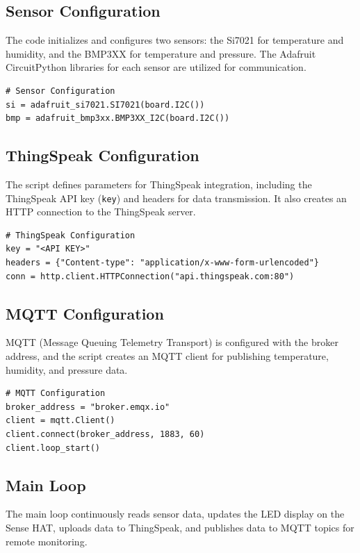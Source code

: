 \documentclass[titlepage]{article}
\begin{document}
\subsection{Sensor Configuration}

The code initializes and configures two sensors: the Si7021 for temperature and humidity, and the BMP3XX for temperature and pressure. The Adafruit CircuitPython libraries for each sensor are utilized for communication.

\begin{verbatim}
# Sensor Configuration
si = adafruit_si7021.SI7021(board.I2C())
bmp = adafruit_bmp3xx.BMP3XX_I2C(board.I2C())
\end{verbatim}

\newpage
\subsection{ThingSpeak Configuration}

The script defines parameters for ThingSpeak integration, including the ThingSpeak API key (\texttt{key}) and headers for data transmission. It also creates an HTTP connection to the ThingSpeak server.

\begin{verbatim}
# ThingSpeak Configuration
key = "<API KEY>"
headers = {"Content-type": "application/x-www-form-urlencoded"}
conn = http.client.HTTPConnection("api.thingspeak.com:80")
\end{verbatim}

\subsection{MQTT Configuration}

MQTT (Message Queuing Telemetry Transport) is configured with the broker address, and the script creates an MQTT client for publishing temperature, humidity, and pressure data.

\begin{verbatim}
# MQTT Configuration
broker_address = "broker.emqx.io"
client = mqtt.Client()
client.connect(broker_address, 1883, 60)
client.loop_start()
\end{verbatim}

\subsection{Main Loop}

The main loop continuously reads sensor data, updates the LED display on the Sense HAT, uploads data to ThingSpeak, and publishes data to MQTT topics for remote monitoring.
\end{document}
